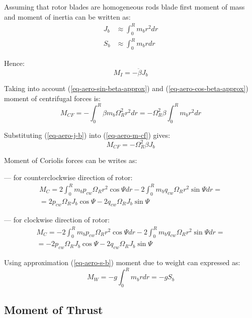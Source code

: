 Assuming that rotor blades are homogeneous rods blade first moment of mass and moment of inertia can be written as: \cite{NASA-TT-F-494}
\begin{align}
  \label{eq-aero-j-b}
  J_b &\approx \int_{0}^{R} m_b r^2 dr \\
  \label{eq-aero-s-b}
  S_b &\approx \int_{0}^{R} m_b r dr
\end{align}

Hence:
\begin{equation}
  M_I = - \ddot \beta J_b
\end{equation}

Taking into account (\ref{eq-aero-sin-beta-approx}) and (\ref{eq-aero-cos-beta-approx}) moment of centrifugal forces is:
\begin{equation}
  \label{eq-aero-m-cf}
  M_{CF} =
  - \int_{0}^{R} \beta m_b \Omega_R^2 r^2 dr =
  - \Omega_R^2 \beta \int_{0}^{R} m_b r^2 dr
\end{equation}

Substituting (\ref{eq-aero-j-b}) into (\ref{eq-aero-m-cf}) gives:
\begin{equation}
  M_{CF} = - \Omega_R^2 \beta J_b
\end{equation}

Moment of Coriolis forces can be writes as:

--- for counterclockwise direction of rotor:
\begin{multline}
  M_C =
    2 \int_{0}^{R} m_b p_{cw} \Omega_R r^2 \cos \Psi dr
  - 2 \int_{0}^{R} m_b q_{cw} \Omega_R r^2 \sin \Psi dr
  = \\ =
  2 p_{cw} \Omega_R J_b \cos \Psi - 2 q_{cw} \Omega_R J_b \sin \Psi
\end{multline}

--- for clockwise direction of rotor:
\begin{multline}
  M_C =
  - 2 \int_{0}^{R} m_b p_{cw} \Omega_R r^2 \cos \Psi dr
  - 2 \int_{0}^{R} m_b q_{cw} \Omega_R r^2 \sin \Psi dr
  = \\ =
  -2 p_{cw} \Omega_R J_b \cos \Psi - 2 q_{cw} \Omega_R J_b \sin \Psi
\end{multline}

Using approximation (\ref{eq-aero-s-b}) moment due to weight can expressed as:
\begin{equation}
  M_W = -g \int_{0}^{R} m_b r dr = -g S_b
\end{equation}

\subsection{Moment of Thrust}


